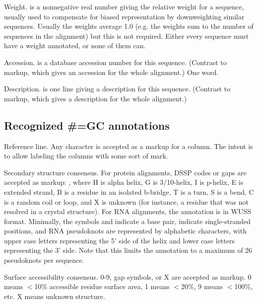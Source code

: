 \begin{sreitems}{}
\item [\emcode{WT  <f>}]
	Weight.  is a nonnegative real number giving the
	relative weight for a sequence, usually used to compensate
	for biased representation by downweighting similar sequences.	
	Usually the weights average 1.0 (e.g. the weights sum to
	the number of sequences in the alignment) but this is not
	required. Either every sequence must have a weight annotated, 
	or none	of them can.  

\item [\emcode{AC  <s>}]
	Accession.  is a database accession number for 
	this sequence. (Contrast to  markup, which gives
	an accession for the whole alignment.) One word. 
	
\item [\emcode{DE  <s>}]
	Description.  is one line giving a description for
	this sequence. (Contrast to  markup, which gives
	a description for the whole alignment.)
\end{sreitems}


\subsection{Recognized \#=GC annotations}

\begin{sreitems}{}
\item [\emcode{RF}]
	Reference line. Any character is accepted as a markup for a
	column. The intent is to allow labeling the columns with some
	sort of mark.
	
\item [\emcode{SS\_cons}] 
        Secondary structure consensus. For protein
	alignments, DSSP codes or gaps are accepted as markup:
	\ccode{[HGIEBTSCX.-\_]}, where H is alpha helix, G is
	3/10-helix, I is p-helix, E is extended strand, B is a residue
	in an isolated b-bridge, T is a turn, S is a bend, C is a
	random coil or loop, and X is unknown (for instance, a residue
	that was not resolved in a crystal structure). For RNA
	alignments, the annotation is in WUSS format. Minimally, the
	symbols \ccode{<} and \ccode{>} indicate a base pair,
	 indicate single-stranded positions, and RNA
	pseudoknots are represented by alphabetic characters, with
	upper case letters representing the 5' side of the helix and
	lower case letters representing the 3' side. Note that this
	limits the annotation to a maximum of 26 pseudoknots per
	sequence.

\item [\emcode{SA\_cons}]
	Surface accessibility consensus. 0-9, gap symbols, or X are
	accepted as markup. 0 means $<$10\% accessible residue surface
	area, 1 means $<$20\%, 9 means $<$100\%, etc. X means unknown
	structure.
\end{sreitems}

